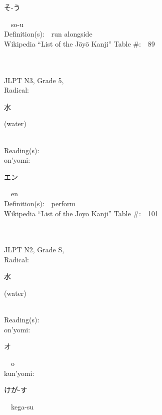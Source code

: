 \begin{multicols}{2}
{\hspace*{2em}}{\begin{CJK}{UTF8}{min} そ-う \end{CJK}}\ \ so-u\ \ \\
Definition(s):\ \ run alongside \\
Wikipedia ``List of the J\=oy\=o Kanji'' Table \#:\ \ 89 \\
\ \ \\
{\fontsize{34pt}{40pt}  }\ \ \\  %
{JLPT N3, Grade 5, \\Radical:\ \ {\begin{CJK}{UTF8}{min} 水 \end{CJK}} (water) } \\
Reading(s):\ \ \\
{\hspace*{1em}}on'yomi:\ \ \\
{\hspace*{2em}}{\begin{CJK}{UTF8}{min} エン \end{CJK}}\ \ en\ \ \\
Definition(s):\ \ perform \\
Wikipedia ``List of the J\=oy\=o Kanji'' Table \#:\ \ 101 \\
\ \ \\
{\fontsize{34pt}{40pt}  }\ \ \\  %
{JLPT N2, Grade S, \\Radical:\ \ {\begin{CJK}{UTF8}{min} 水 \end{CJK}} (water) } \\
Reading(s):\ \ \\
{\hspace*{1em}}on'yomi:\ \ \\
{\hspace*{2em}}{\begin{CJK}{UTF8}{min} オ \end{CJK}}\ \ o\ \ \\
{\hspace*{1em}}kun'yomi:\ \ \\
{\hspace*{2em}}{\begin{CJK}{UTF8}{min} けが-す \end{CJK}}\ \ kega-su\ \ \\

\end{multicols}
